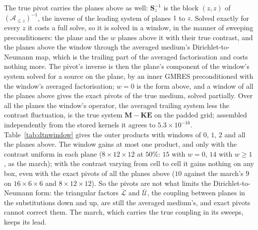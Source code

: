 \documentclass[11pt,a4paper]{article}
\newcommand{\bK}{\mathbf{K}}
\begin{document}
The true pivot carries the planes above as well: $\mathbf S_z^{-1}$ is the block $(z,z)$ of
$(\mathcal A_{\le z})^{-1}$, the inverse of the leading system of planes $1$ to $z$. Solved exactly for every $z$
it costs a full solve, so it is solved in a window, in the manner of sweeping preconditioners: the plane and the
$w$ planes above it with their true contrast, and the planes above the window through the averaged medium's
Dirichlet-to-Neumann map, which is the trailing part of the averaged factorisation and costs nothing more. The
pivot's inverse is then the plane's component of the window's system solved for a source on the plane, by an
inner GMRES preconditioned with the window's averaged factorisation; $w=0$ is the form above, and a window of all
the planes above gives the exact pivots of the true medium, solved partially. Over all the planes the window's
operator, the averaged trailing system less the contrast fluctuation, is the true system
$\mathbf M-\bK\mathbf E$ on the padded grid; assembled independently from the stored kernels it agrees to
$5.3\times10^{-16}$. Table~\ref{tab:dtnwindow} gives the outer products with windows of $0$, $1$, $2$ and all the planes above.
The window gains at most one product, and only with the contrast uniform in each plane ($8\times12\times12$ at
$50\%$: $15$ with $w=0$, $14$ with $w\ge1$, as the march); with the contrast varying from cell to cell it gains
nothing on any box, even with the exact pivots of all the planes above ($10$ against the march's $9$ on
$16\times6\times6$ and $8\times12\times12$). So the pivots are not what limits the Dirichlet-to-Neumann form: the
triangular factors $\bar{\mathcal L}$ and $\bar{\mathcal U}$, the coupling between planes in the substitutions
down and up, are still the averaged medium's, and exact pivots cannot correct them. The march, which carries the
true coupling in its sweeps, keeps its lead.
\end{document}
